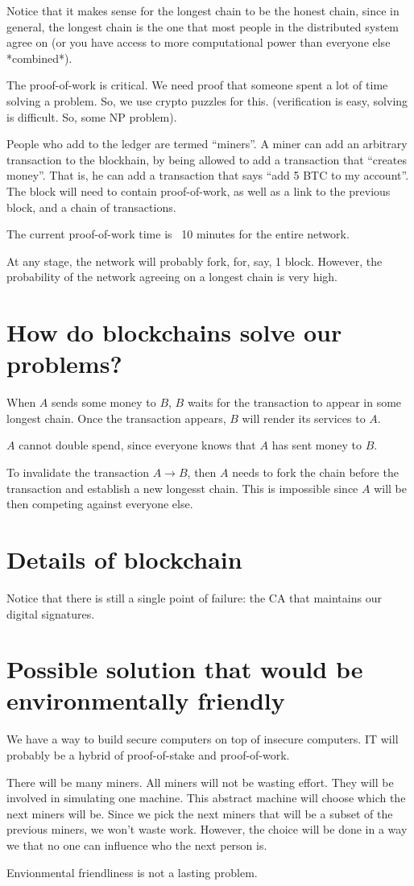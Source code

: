 \documentclass[11pt]{article}
\begin{document}
Notice that it makes sense for the longest chain to be the honest chain, since in general, the longest chain is the
one that most people in the distributed system agree on (or you have access to more computational power than everyone else *combined*).


The proof-of-work is critical. We need proof that someone spent a lot of time solving a problem. So, we use
crypto puzzles for this. (verification is easy, solving is difficult. So, some NP problem).

People who add to the ledger are termed ``miners''.
A miner can add an arbitrary transaction to the blockhain, by being allowed to add a transaction that ``creates money''.
That is, he can add a transaction that says ``add 5 BTC to my account''. The block will need to contain proof-of-work,
as well as a link to the previous block, and a chain of transactions.


The current proof-of-work time is ~10 minutes for the entire network.


At any stage, the network will probably fork, for, say, 1 block. However, the probability of the network agreeing on a longest chain
is very high.

\section{How do blockchains solve our problems?}

When $A$ sends some money to $B$, $B$ waits for the transaction to appear in some longest chain. Once the transaction appears,
$B$ will render its services to $A$.

$A$ cannot double spend, since everyone knows that $A$ has sent money to $B$.

To invalidate the transaction $A \rightarrow B$, then $A$ needs to fork the chain before the transaction and establish a new
longesst chain. This is impossible since $A$ will be then competing against everyone else.


\section{Details of blockchain}



Notice that there is still a single point of failure: the CA that maintains our digital signatures.

\section{Possible solution that would be environmentally friendly}

We have a way to build secure computers on top of insecure computers. IT will probably be a hybrid of proof-of-stake
and proof-of-work.


There will be many miners. All miners will not be wasting effort. They will be involved in simulating one machine.
This abstract machine will choose which the next miners will be. Since we pick the next miners that will be a
subset of the previous miners, we won't waste work. However, the choice will be done in a way we that no one can
influence who the next person is.

Envionmental friendliness is not a lasting problem.
\end{document}
